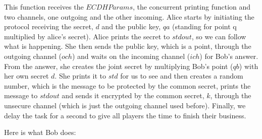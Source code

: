 \documentclass[tikz]{scrreprt}
\newcommand{\Conid}[1]{\mathit{#1}}
\newcommand{\Varid}[1]{\mathit{#1}}
\begin{document}
This function receives the \ensuremath{\Conid{ECDHParams}}, 
the concurrent printing function
and two channels, one outgoing and the other incoming.
Alice starts by initiating the protocol
receiving the secret, \ensuremath{\Varid{d}} and the public key, \ensuremath{\Varid{qa}}
(standing for point q multiplied by alice's secret).
Alice prints the secret to $stdout$, so we can follow
what is happening.
She then sends the public key, which is a point,
through the outgoing channel (\ensuremath{\Varid{och}}) and waits
on the incoming channel (\ensuremath{\Varid{ich}}) for Bob's answer.
From the answer, she creates the joint secret
by multiplying Bob's point (\ensuremath{\Varid{qb}}) with her own secret \ensuremath{\Varid{d}}.
She prints it to $std$ for us to see and then creates
a random number, which is the message to be protected
by the common secret, prints the message to $stdout$ and
sends it encrypted by the common secret, \ensuremath{\Varid{k}}, 
through the unsecure channel (which is just the
outgoing channel used before).
Finally, we delay the task for a second
to give all players the time to finish their business.

Here is what Bob does:
\end{document}
